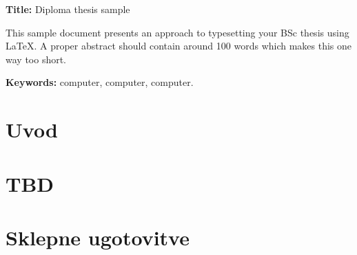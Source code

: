 \documentclass[a4paper, 12pt]{book}
\newcommand{\ttitleEn}{Diploma thesis sample}
\newcommand{\tkeywordsEn}{computer, computer, computer}
\newcommand{\clearemptydoublepage}{\newpage{\pagestyle{empty}\cleardoublepage}}
\begin{document}
\noindent\textbf{Title:} \ttitleEn
\bigskip

\noindent This sample document presents an approach to typesetting your BSc thesis using \LaTeX. A proper abstract should contain around 100 words which makes this one way too short.
\bigskip

\noindent\textbf{Keywords:} \tkeywordsEn.
\clearemptydoublepage

\mainmatter
\setcounter{page}{1}
\pagestyle{fancy}

\chapter{Uvod}

\chapter{TBD}



\chapter{Sklepne ugotovitve}



\end{document}
